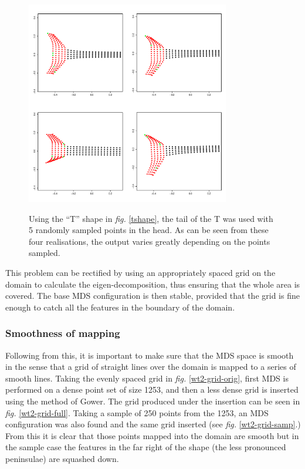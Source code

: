 \documentclass[a4paper,10pt]{article}
\newcommand{\fig}[1]{\emph{fig.} \ref{#1}}
\begin{document}
\begin{figure}
\centering
\includegraphics[width=3.5in]{figs/tshaperand.pdf} \\
\caption{Using the ``T'' shape in \fig{tshape}, the tail of the T was used with 5 randomly sampled points in the head. As can be seen from these four realisations, the output varies greatly depending on the points sampled.}
\label{tshaperand}
\end{figure}

This problem can be rectified by using an appropriately spaced grid on the domain to calculate the eigen-decomposition, thus ensuring that the whole area is covered. The base MDS configuration is then stable, provided that the grid is fine enough to catch all the features in the boundary of the domain.

\subsubsection{Smoothness of mapping}

Following from this, it is important to make sure that the MDS space is smooth in the sense that a grid of straight lines over the domain is mapped to a series of smooth lines. Taking the evenly spaced grid in \fig{wt2-grid-orig}, first MDS is performed on a dense point set of size 1253, and then a less dense grid is inserted using the method of Gower. The grid produced under the insertion can be seen in \fig{wt2-grid-full}. Taking a sample of 250 points from the 1253, an MDS configuration was also found and the same grid inserted (see \fig{wt2-grid-samp}.) From this it is clear that those points mapped into the domain are smooth but in the sample case the features in the far right of the shape (the less pronounced peninsulae) are squashed down.
\end{document}
